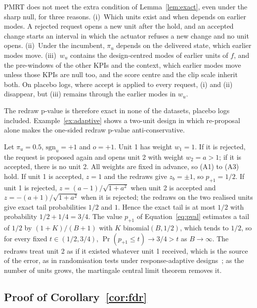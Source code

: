 PMRT does not meet the extra condition of Lemma~\ref{lem:exact}, even under the sharp null, for three reasons.
(i)~Which units exist and when depends on earlier modes. A rejected request opens a new unit after the hold, and an
accepted change starts an interval in which the actuator refuses a new change and no unit opens. (ii)~Under the
incumbent, $\pi_u$ depends on the delivered state, which earlier modes move. (iii)~$w_u$ contains the design-centred modes of earlier units of $f$, and the
pre-windows of the other KPIs and the context, which earlier modes move unless those KPIs are null
too, and the score centre and the clip scale inherit both. On placebo logs, where accept is
applied to every request, (i) and (ii) disappear, but (iii) remains through the earlier modes in
$w_u$.

The redraw p-value is therefore exact in none of the datasets, placebo logs included.
Example~\ref{ex:adaptive} shows a two-unit design in which re-proposal alone makes the one-sided redraw p-value
anti-conservative.

\begin{example}
\label{ex:adaptive}
Let $\pi_u = 0.5$, $\mathrm{sgn}_u = +1$ and $o = +1$. Unit 1 has weight $w_1 = 1$. If it is
rejected, the request is proposed again and opens unit 2 with weight $w_2 = a > 1$; if it is
accepted, there is no unit 2. All weights are fixed in advance, so (A1) to (A3) hold. If unit 1 is
accepted, $z = 1$ and the redraws give $z_b = \pm 1$, so $p_{+1} = 1/2$. If unit 1 is rejected,
$z = (a - 1)/\sqrt{1 + a^2}$ when unit 2 is accepted and $z = -(a + 1)/\sqrt{1 + a^2}$ when it is
rejected; the redraws on the two realised units give exact tail probabilities $1/2$ and $1$. Hence the
exact tail is at most $1/2$ with probability $1/2 + 1/4 = 3/4$. The value $p_{+1}$ of Equation~\eqref{eq:pval} estimates
a tail of $1/2$ by $(1 + K)/(B + 1)$ with $K$ binomial$(B, 1/2)$, which tends to $1/2$, so for every fixed
$t \in (1/2, 3/4)$, $\Pr(p_{+1} \le t) \to 3/4 > t$ as $B \to \infty$. The redraws treat unit 2 as if it
existed whatever unit 1 received, which is the source of the error, as in randomisation tests under
response-adaptive designs~\cite{simon2011randomization}; as the number of units grows,
the martingale central limit theorem removes it.
\end{example}

\subsection{Proof of Corollary~\ref{cor:fdr}}
\label{app:proof_cor}

